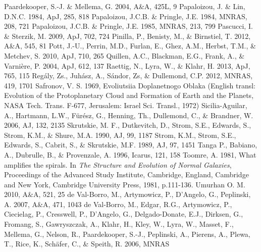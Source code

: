 \documentclass[apj]{emulateapj}
\begin{document}
\begin{thebibliography}{}
 Paardekooper, S.-J. \& Mellema, G.	2004, A\&A, 425L, 9
 Papaloizou, J. \& Lin, D.N.C. 1984, ApJ, 285, 818
 Papaloizou, J.C.B. \& Pringle, J.E. 1984, MNRAS, 208, 721
 Papaloizou, J.C.B. \& Pringle, J.E. 1985, MNRAS, 213, 799
 Pascucci, I. \& Sterzik, M. 2009, ApJ, 702, 724
 Pinilla, P., Benisty, M., \& Birnstiel, T. 2012, A\&A, 545, 81
 Pott, J.-U., Perrin, M.D., Furlan, E., Ghez, A.M., Herbst, T.M., \& Metchev, S. 2010, ApJ, 710, 265
 Quillen, A.C., Blackman, E.G., Frank, A., \& Varni\`ere, P. 2004, ApJ, 612, 137
 Raettig, N., Lyra, W., \& Klahr, H. 2013, ApJ, 765, 115
 Reg\'aly, Zs., Juh\'asz, A., S\'andor, Zs, \& Dullemond, C.P. 2012, MNRAS, 419, 1701
 Safronov, V. S. 1969, Evoliutsiia Doplanetnogo Oblaka (English transl: Evolution of the
  Protoplanetary Cloud and Formation of Earth and the Planets, NASA Tech. Trans. F-677, Jerusalem: Israel Sci. Transl., 1972)
 Sicilia-Aguilar, A., Hartmann, L.W., F\"ur\'esz, G., Henning, Th., Dullemond, C., \& Brandner, W. 2006, AJ, 132, 2135
 Skrutskie, M. F., Dutkevitch, D., Strom, S.E., Edwards, S., Strom, K.M., \& Shure, M.A. 1990, AJ, 99, 1187
 Strom, K.M., Strom, S.E., Edwards, S., Cabrit, S., \& Skrutskie, M.F. 1989, AJ, 97, 1451
 Tanga P., Babiano, A., Dubrulle, B., \& Provenzale, A. 1996, Icarus, 121, 158
 Toomre, A. 1981, What amplifies the spirals. In {\it The Structure and Evolution of Normal Galaxies},
  Proceedings of the Advanced Study Institute, Cambridge, England,
  Cambridge and New York, Cambridge University Press, 1981, p.111-136.
 Umurhan O. M. 2010, A\&A, 521,  25
de Val-Borro, M., Artymowicz, P., D'Angelo, G., Peplinski, A. 2007, A\&A, 471, 1043
de Val-Borro, M., Edgar, R.G., Artymowicz, P., Ciecielag, P., Cresswell, P., D'Angelo, G., Delgado-Donate, E.J., Dirksen, G., Fromang, S., Gawryszczak, A., Klahr, H., Kley, W., Lyra, W., Masset, F., Mellema, G., Nelson, R., Paardekooper, S.-J., Peplinski, A., Pierens, A., Plewa, T., Rice, K., Sch\"afer, C., \& Speith, R. 2006, MNRAS

\end{thebibliography}
\end{document}
